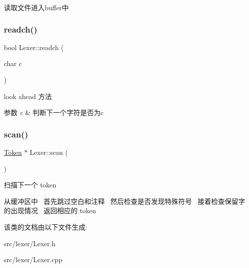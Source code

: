 读取文件进入buffer中 \mbox{\label{class_lexer_acbe68a5d98ebc3b3a87fd27f000030a5}} 
\subsubsection{\texorpdfstring{readch()}{readch()}}
{\footnotesize\ttfamily bool Lexer\+::readch (\begin{DoxyParamCaption}\item[{char}]{c }\end{DoxyParamCaption})}



look ahead 方法 


\begin{DoxyParams}{参数}
{\em c} & 判断下一个字符是否为c \\
\hline
\end{DoxyParams}
\mbox{\label{class_lexer_a2085b8262f6237de60583375ee2731f4}} 
\subsubsection{\texorpdfstring{scan()}{scan()}}
{\footnotesize\ttfamily \hyperlink{class_token}{Token} $\ast$ Lexer\+::scan (\begin{DoxyParamCaption}{ }\end{DoxyParamCaption})}



扫描下一个 token 

从缓冲区中~\newline
首先跳过空白和注释~\newline
然后检查是否发现特殊符号~\newline
接着检查保留字的出现情况~\newline
返回相应的 token~\newline


该类的文档由以下文件生成\+:\begin{DoxyCompactItemize}
\item 
src/lexer/Lexer.\+h\item 
src/lexer/Lexer.\+cpp\end{DoxyCompactItemize}
